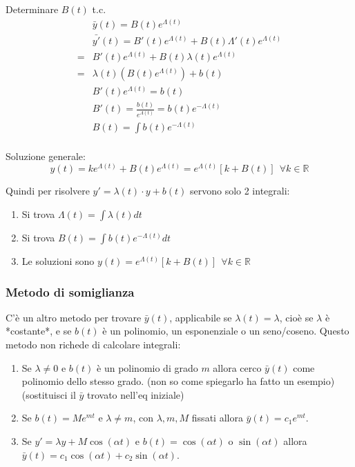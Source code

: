 \begin{problema}
    Determinare $B(t)$ t.c.
    \begin{align*}
        &\bar{y}(t) = B(t) e^{\Lambda(t)} \\
        &\bar{y'}(t) = B'(t) e^{\Lambda(t)} + B(t) \Lambda'(t) e^{\Lambda(t)} \\
        =& B'(t) e^{\Lambda(t)} + B(t) \lambda(t)e^{\Lambda(t)} \\
        =& \lambda(t)(B(t)e^{\Lambda(t)}) + b(t) \\
        & B'(t)e^{\Lambda(t)} = b(t) \\
        & B'(t) = \frac{b(t)}{e^{\Lambda(t)}} = b(t)e^{-\Lambda(t)} \\
        & B(t) = \int b(t)e^{-\Lambda(t)} \\
    \end{align*}
\end{problema}

Soluzione generale:
\begin{equation}
    y(t) = ke^{\Lambda(t)} + B(t)e^{\Lambda(t)} = e^{\Lambda(t)}[k+B(t)]\ \ \forall k\in \mathbb{R}
\end{equation}

Quindi per risolvere $y' = \lambda(t) \cdot y + b(t)$ servono solo 2 integrali:
\begin{enumerate}
    \item Si trova $\Lambda(t) = \int \lambda(t) dt$
    \item Si trova $B(t) = \int b(t)e^{-\Lambda(t)} dt$
    \item Le soluzioni sono $y(t) = e^{\Lambda(t)}[k+B(t)]\ \ \forall k\in \mathbb{R}$
\end{enumerate}

\subsubsection{Metodo di somiglianza}
C'è un altro metodo per trovare $\bar{y}(t)$, applicabile se $\lambda(t) = \lambda$, cioè se $\lambda$ è *costante*, e se $b(t)$ è un polinomio, un esponenziale o un seno/coseno. Questo metodo non richede di calcolare integrali:
\begin{enumerate}
    \item Se $\lambda \not = 0$ e $b(t)$ è un polinomio di grado $m$ allora cerco $\bar{y}(t)$ come polinomio dello stesso grado. (non so come spiegarlo ha fatto un esempio) \\
        (sostituisci il $\bar{y}$ trovato nell'eq iniziale)
    \item Se $b(t) = Me^{mt}$ e $\lambda \not= m$, con $\lambda, m, M$ fissati allora $\bar{y}(t)=c_1e^{mt}$.
    \item Se $y' = \lambda y + M \cos(\alpha t)$ e $b(t) = \cos(\alpha t)$ o $\sin(\alpha t)$ allora $\bar{y}(t) = c_1\cos(\alpha t) + c_2\sin(\alpha t)$.
\end{enumerate}

